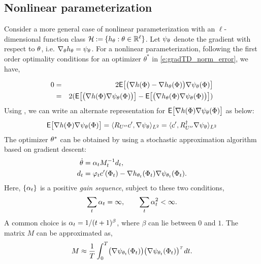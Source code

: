 \subsection{Nonlinear parameterization}
Consider a more general case of nonlinear parameterization with an $\ell$- dimensional function class ${\cal H} \mathbin{:=} \{h_\theta : \theta \in \mathbb{R}^\ell\}$. Let $\psi_\theta$ denote the gradient with respect to $\theta$, i.e. $\nabla_\theta h_\theta = \psi_\theta$. For a nonlinear parameterization, following the first order optimality conditions for an optimizer $\theta^{*}$ in \eqref{e:gradTD_norm_error}, we have,

\begin{eqnarray*}
	0 & = &2 {\sf E} \bigl[\bigl(\nabla h(\Phi) - \nabla h_\theta (\Phi)\bigr) \nabla \psi_\theta (\Phi)\bigr]\\
	& = & 2 ({\sf E} \bigl[\bigl(\nabla h(\Phi)\nabla \psi_\theta (\Phi)\bigr)\bigr] - {\sf E} \bigl[\bigl(\nabla h_\theta (\Phi)\nabla \psi_\theta (\Phi)\bigr)\bigr])
\end{eqnarray*}
Using , we can write an alternate representation for ${\sf E} \bigl[ \nabla h(\Phi)\nabla \psi_\theta (\Phi)\bigr]$ as below:
\begin{eqnarray*}
	{\sf E}\bigl[\nabla h(\Phi)\nabla \psi_\theta (\Phi)\bigr]=\langle R_{U''}c',\nabla \psi_\theta\rangle_{L^2} =\langle c', R_{U''}^\dagger \nabla \psi_\theta\rangle_{L^2}
\end{eqnarray*}
The optimizer $\theta^*$ can be obtained by using a stochastic approximation algorithm based on gradient descent: 
\begin{equation*}
\begin{aligned}
\dot{\theta}&=\alpha_t M_{t}^{-1} d_t, \\ 
d_t & =\varphi_t  c'(\Phi_t)-\nabla h_{\theta_{t}}(\Phi_t)\nabla \psi_{\theta_{t}}(\Phi_t).
\end{aligned}
\end{equation*}
Here, $\{\alpha_t\}$ is a positive \textit{gain sequence}, subject to these two conditions, 
\[
\sum_t \alpha_t = \infty, \qquad \sum_t \alpha_t^2 < \infty.
\]
A common choice is $\alpha_t = 1/(t+1)^\beta$, where $\beta$ can lie between $0$ and $1$. The matrix $M$ can be approximated as,
\[
M \approx \frac{1}{T}\int_0^T\bigl(\nabla \psi_{\theta_t}(\Phi_t)\bigr)\bigl(\nabla \psi_{\theta_t}(\Phi_t)\bigr)^{{\hbox{\tiny\it T}}}\, dt.
\]

